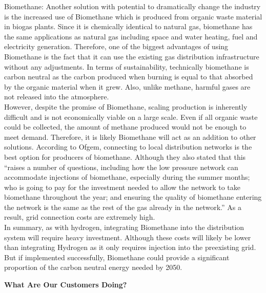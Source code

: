 \documentclass[11pt]{article}		%
\begin{document}
            Biomethane: 
            Another solution with potential to dramatically change the industry is the increased use of Biomethane which is produced from organic waste material in biogas plants. Since it is chemically identical to natural gas, biomethane has the same applications as natural gas including space and water heating, fuel and electricity generation. Therefore, one of the biggest advantages of using Biomethane is the fact that it can use the existing gas distribution infrastructure without any adjustments. In terms of sustainability, technically biomethane is carbon neutral as the carbon produced when burning is equal to that absorbed by the organic material when it grew. Also, unlike methane, harmful gases are not released into the atmosphere.\\
    	    \hspace*{3ex}However, despite the promise of Biomethane, scaling production is inherently difficult and is not economically viable on a large scale. Even if all organic waste could be collected, the amount of methane produced would not be enough to meet demand. Therefore, it is likely Biomethane will act as an addition to other solutions. According to Ofgem, connecting to local distribution networks is the best option for producers of biomethane. Although they also stated that this “raises a number of questions, including how the low pressure network can accommodate injections of biomethane, especially during the summer months; who is going to pay for the investment needed to allow the network to take biomethane throughout the year; and ensuring the quality of biomethane entering the network is the same as the rest of the gas already in the network.” As a result, grid connection costs are extremely high.\\
        	\hspace*{3ex}In summary, as with hydrogen, integrating Biomethane into the distribution system will require heavy investment. Although these costs will likely be lower than integrating Hydrogen as it only requires injection into the preexisting grid. But if implemented successfully, Biomethane could provide a significant proportion of the carbon neutral energy needed by 2050.
    
    		\textbf{What Are Our Customers Doing?}\\
    		
\end{document}
